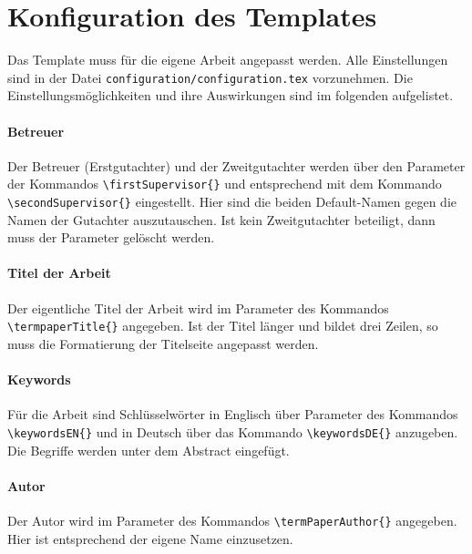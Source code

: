 %
\section{Konfiguration des Templates}\label{sec:configurations}
Das Template muss für die eigene Arbeit angepasst werden. Alle Einstellungen sind in der Datei \texttt{configuration/configuration.tex} vorzunehmen. Die Einstellungsmöglichkeiten und ihre Auswirkungen sind im folgenden aufgelistet.

\paragraph{Betreuer} Der Betreuer (Erstgutachter) und der Zweitgutachter werden über den Parameter der Kommandos \texttt{\textbackslash firstSupervisor\{\}} und entsprechend mit dem Kommando \texttt{\textbackslash secondSupervisor\{\}} eingestellt. Hier sind die beiden Default-Namen gegen die Namen der Gutachter auszutauschen. Ist kein Zweitgutachter beteiligt, dann muss der Parameter gelöscht werden.

\paragraph{Titel der Arbeit} Der eigentliche Titel der Arbeit wird im Parameter des Kommandos \texttt{\textbackslash termpaperTitle\{\}} angegeben. Ist der Titel länger und bildet drei Zeilen, so muss die Formatierung der Titelseite angepasst werden.

\paragraph{Keywords} Für die Arbeit sind Schlüsselwörter in Englisch über Parameter des Kommandos \texttt{\textbackslash keywordsEN\{\}} und in Deutsch über das Kommando \texttt{\textbackslash keywordsDE\{\}} anzugeben. Die Begriffe werden unter dem Abstract eingefügt.

\paragraph{Autor} Der Autor wird im Parameter des Kommandos \texttt{\textbackslash termPaperAuthor\{\}} angegeben. Hier ist entsprechend der eigene Name einzusetzen.

